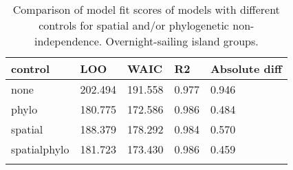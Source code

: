 \begin{longtable}{p{2cm}p{2cm}p{2cm}p{2cm}p{2cm}}
  \toprule
control & LOO & WAIC & R2 & Absolute diff \\ 
  \midrule
none & 202.494 & 191.558 & 0.977 & 0.946 \\ 
  phylo & 180.775 & 172.586 & 0.986 & 0.484 \\ 
  spatial & 188.379 & 178.292 & 0.984 & 0.570 \\ 
  spatialphylo & 181.723 & 173.430 & 0.986 & 0.459 \\ 
   \bottomrule
\caption{Comparison of model fit scores of models with different controls for spatial and/or phylogenetic non-independence. Overnight-sailing island groups.} 
\label{model_fit_score_table_SBZR}
\end{longtable}
